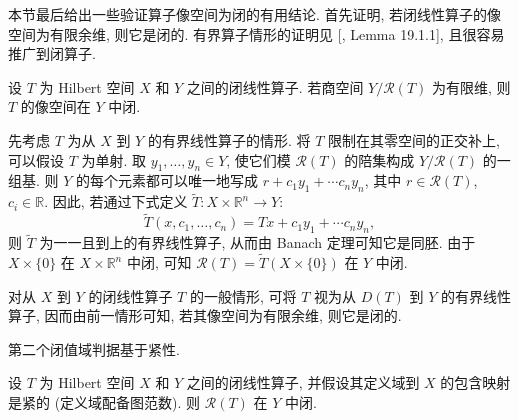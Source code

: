 {本节最后给出一些验证算子像空间为闭的有用结论. 首先证明, 若闭线性算子的像空间为有限余维, 则它是闭的. 有界算子情形的证明见 [, Lemma 19.1.1], 且很容易推广到闭算子.}


\begin{Theorem}\label{thm:finite-codimension-closed-range}
{设 $T$ 为 Hilbert 空间 $X$ 和 $Y$ 之间的闭线性算子. 若商空间 $Y/\mathcal R(T)$ 为有限维, 则 $T$ 的像空间在 $Y$ 中闭.}
\end{Theorem}

\begin{Proof}
{先考虑 $T$ 为从 $X$ 到 $Y$ 的有界线性算子的情形. 将 $T$ 限制在其零空间的正交补上, 可以假设 $T$ 为单射. 取 $y_1,\ldots,y_n\in Y$, 使它们模 $\mathcal R(T)$ 的陪集构成 $Y/\mathcal R(T)$ 的一组基. 则 $Y$ 的每个元素都可以唯一地写成 $r+c_1y_1+\cdots c_ny_n$, 其中 $r\in\mathcal R(T)$, $c_i\in\mathbb R$. 因此, 若通过下式定义 $\widetilde T:X\times\mathbb R^n\to Y$:}
\[
\widetilde T(x,c_1,\ldots,c_n)=Tx+c_1y_1+\cdots c_ny_n,
\]
{则 $\widetilde T$ 为一一且到上的有界线性算子, 从而由 Banach 定理可知它是同胚. 由于 $X\times\{0\}$ 在 $X\times\mathbb R^n$ 中闭, 可知 $\mathcal R(T)=\widetilde T(X\times\{0\})$ 在 $Y$ 中闭.}

{对从 $X$ 到 $Y$ 的闭线性算子 $T$ 的一般情形, 可将 $T$ 视为从 $D(T)$ 到 $Y$ 的有界线性算子, 因而由前一情形可知, 若其像空间为有限余维, 则它是闭的.}
\end{Proof}

{第二个闭值域判据基于紧性.}


\begin{Theorem}\label{thm:compact-domain-closed-range}
{设 $T$ 为 Hilbert 空间 $X$ 和 $Y$ 之间的闭线性算子, 并假设其定义域到 $X$ 的包含映射是紧的 (定义域配备图范数). 则 $\mathcal R(T)$ 在 $Y$ 中闭.}
\end{Theorem}

